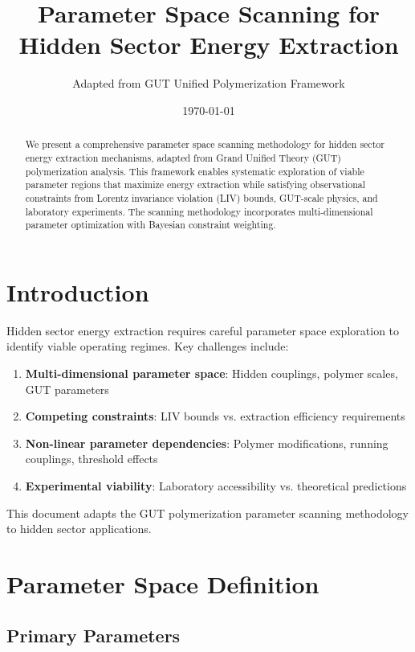 \documentclass[11pt]{article}
\title{Parameter Space Scanning for Hidden Sector Energy Extraction}
\author{Adapted from GUT Unified Polymerization Framework}
\date{\today}
\begin{document}
\maketitle

\begin{abstract}
    We present a comprehensive parameter space scanning methodology for hidden sector energy extraction mechanisms, adapted from Grand Unified Theory (GUT) polymerization analysis. This framework enables systematic exploration of viable parameter regions that maximize energy extraction while satisfying observational constraints from Lorentz invariance violation (LIV) bounds, GUT-scale physics, and laboratory experiments. The scanning methodology incorporates multi-dimensional parameter optimization with Bayesian constraint weighting.
\end{abstract}

\section{Introduction}

Hidden sector energy extraction requires careful parameter space exploration to identify viable operating regimes. Key challenges include:

\begin{enumerate}
    \item \textbf{Multi-dimensional parameter space}: Hidden couplings, polymer scales, GUT parameters
    \item \textbf{Competing constraints}: LIV bounds vs. extraction efficiency requirements
    \item \textbf{Non-linear parameter dependencies}: Polymer modifications, running couplings, threshold effects
    \item \textbf{Experimental viability}: Laboratory accessibility vs. theoretical predictions
\end{enumerate}

This document adapts the GUT polymerization parameter scanning methodology to hidden sector applications.

\section{Parameter Space Definition}

\subsection{Primary Parameters}
\end{document}
